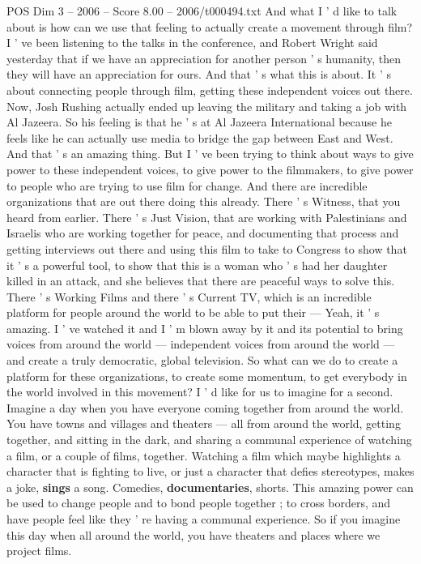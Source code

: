 \begin{textsample}{POS Dim 3 – 2006 – Score 8.00 – 2006/t000494.txt}
And what I ' d like to talk about is how can we use that feeling to actually create a movement through film?
I ' ve been listening to the talks in the conference, and Robert Wright said yesterday that if we have an appreciation for another person ' s humanity, then they will have an appreciation for ours.
And that ' s what this is about.
It ' s about connecting people through film, getting these independent voices out there.
Now, Josh Rushing actually ended up leaving the military and taking a job with Al Jazeera.
So his feeling is that he ' s at Al Jazeera International because he feels like he can actually use media to bridge the gap between East and West.
And that ' s an amazing thing.
But I ' ve been trying to think about ways to give power to these independent voices, to give power to the filmmakers, to give power to people who are trying to use film for change.
And there are incredible organizations that are out there doing this already.
There ' s Witness, that you heard from earlier.
There ' s Just Vision, that are working with Palestinians and Israelis who are working together for peace, and documenting that process and getting interviews out there and using this film to take to Congress to show that it ' s a powerful tool, to show that this is a woman who ' s had her daughter killed in an attack, and she believes that there are peaceful ways to solve this.
There ' s Working Films and there ' s Current TV, which is an incredible platform for people around the world to be able to put their — Yeah, it ' s amazing.
I ' ve watched it and I ' m blown away by it and its potential to bring voices from around the world — independent voices from around the world — and create a truly democratic, global television.
So what can we do to create a platform for these organizations, to create some momentum, to get everybody in the world involved in this movement?
I ' d like for us to imagine for a second.
Imagine a day when you have everyone coming together from around the world.
You have towns and villages and theaters — all from around the world, getting together, and sitting in the dark, and sharing a communal experience of watching a film, or a couple of films, together.
Watching a film which maybe highlights a character that is fighting to live, or just a character that defies stereotypes, makes a joke, \textbf{sings} a song.
Comedies, \textbf{documentaries}, shorts.
This amazing power can be used to change people and to bond people together ; to cross borders, and have people feel like they ' re having a communal experience.
So if you imagine this day when all around the world, you have theaters and places where we project films.

\end{textsample}
